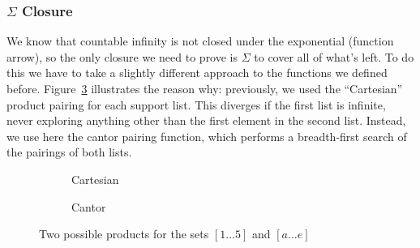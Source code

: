 \subsubsection{\(\Sigma\) Closure}
We know that countable infinity is not closed under the exponential (function
arrow), so the only closure we need to prove is \(\Sigma\) to cover all of
what's left.
To do this we have to take a slightly different approach to the functions we
defined before.
Figure~\ref{pairings} illustrates the reason why: previously, we used the
``Cartesian'' product pairing for each support list.
This diverges if the first list is infinite, never exploring anything other than
the first element in the second list.
Instead, we use here the cantor pairing function, which performs a breadth-first
search of the pairings of both lists.
\begin{figure}
  \centering
  \begin{subfigure}[b]{.5\linewidth}
    \caption{Cartesian}
    \label{cartesian}
  \end{subfigure}%
  \begin{subfigure}[b]{.5\linewidth}
    \caption{Cantor}
    \label{cantor}
  \end{subfigure}
  \caption{Two possible products for the sets \(\left[ 1 \dots 5 \right]\) and
    \(\left[  a \dots e \right]\)}
  \label{pairings}
\end{figure}

